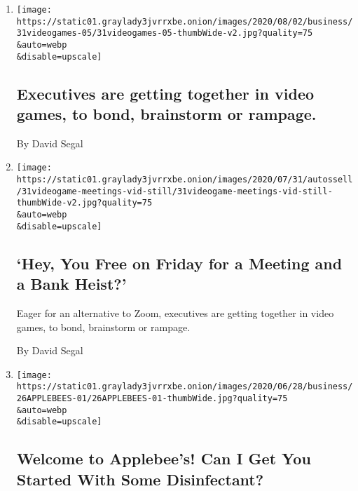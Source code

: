 \begin{enumerate}
\def\labelenumi{\arabic{enumi}.}
\item
  \href{/2020/07/31/business/executives-are-getting-together-in-video-games-to-bond-brainstorm-or-rampage.html}{}

  \texttt{[image: https://static01.graylady3jvrrxbe.onion/images/2020/08/02/business/31videogames-05/31videogames-05-thumbWide-v2.jpg?quality=75\\\&auto=webp\\\&disable=upscale]}

  \hypertarget{executives-are-getting-together-in-video-games-to-bond-brainstorm-or-rampage}{%
  \subsection{Executives are getting together in video games, to bond,
  brainstorm or
  rampage.}\label{executives-are-getting-together-in-video-games-to-bond-brainstorm-or-rampage}}

  By David Segal
\item
  \href{/2020/07/31/business/video-game-meetings.html}{}

  \texttt{[image: https://static01.graylady3jvrrxbe.onion/images/2020/07/31/autossell/31videogame-meetings-vid-still/31videogame-meetings-vid-still-thumbWide-v2.jpg?quality=75\\\&auto=webp\\\&disable=upscale]}

  \hypertarget{hey-you-free-on-friday-for-a-meeting-and-a-bank-heist}{%
  \subsection{`Hey, You Free on Friday for a Meeting and a Bank
  Heist?'}\label{hey-you-free-on-friday-for-a-meeting-and-a-bank-heist}}

  Eager for an alternative to Zoom, executives are getting together in
  video games, to bond, brainstorm or rampage.

  By David Segal
\item
  \href{/2020/06/26/business/restaurant-reopenings-coronavirus.html}{}

  \texttt{[image: https://static01.graylady3jvrrxbe.onion/images/2020/06/28/business/26APPLEBEES-01/26APPLEBEES-01-thumbWide.jpg?quality=75\\\&auto=webp\\\&disable=upscale]}

  \hypertarget{welcome-to-applebees-can-i-get-you-started-with-some-disinfectant}{%
  \subsection{Welcome to Applebee's! Can I Get You Started With Some
  Disinfectant?}\label{welcome-to-applebees-can-i-get-you-started-with-some-disinfectant}}


\end{enumerate}

